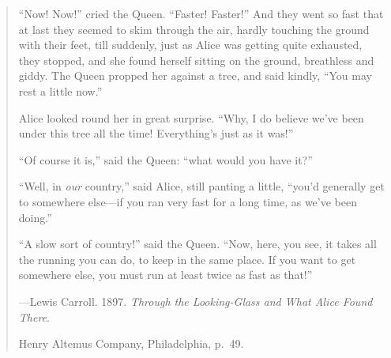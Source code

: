 

\cleardoublepage{}

\thispagestyle{empty} %

\vspace*{50 mm}

\small{}

\begin{quote}
	\protrudeleft``Now! Now!'' cried the Queen. 
	``Faster! Faster!'' 
	And they went so fast that at last they seemed to skim through the air, 
	hardly touching the ground with their feet, 
	till suddenly, 
	just as Alice was getting quite exhausted, 
	they stopped, 
	and she found herself sitting on the ground, 
	breathless and giddy. 
	The Queen propped her against a tree, and said kindly, 
	``You may rest a little now.''

	Alice looked round her in great surprise. 
	``Why, I do believe we've been under this tree all the time! 
	Everything's just as it was!''

	``Of course it is,'' said the Queen: ``what would you have it?'' %

	``Well, in \emph{our} country,'' said Alice, still panting a little, %
	``you'd generally get to somewhere else---if you ran very fast for a long time, 
	as we've been doing.''

	``A slow sort of country!'' said the Queen. 
	``Now, here, you see, it takes all the running you can do, to keep in the same place. 
	If you want to get somewhere else, you must run at least twice as fast as that!''

	\vspace{3 mm} %
	
		{%
		\setlength{\parskip}{0.0pt} %
		\hfill---Lewis Carroll. 1897.%
				 \emph{Through the Looking-Glass and What Alice Found There}.
	
		\hfill Henry Altemus Company, Philadelphia, p.~49.}
\end{quote}

\normalsize{}



